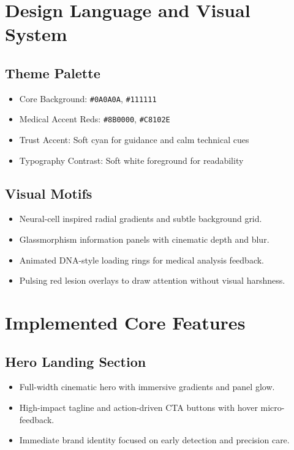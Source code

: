 \documentclass[12pt,a4paper]{article}
\begin{document}
\section{Design Language and Visual System}
\subsection{Theme Palette}
\begin{itemize}[leftmargin=1.5em]
    \item Core Background: \texttt{\#0A0A0A}, \texttt{\#111111}
    \item Medical Accent Reds: \texttt{\#8B0000}, \texttt{\#C8102E}
    \item Trust Accent: Soft cyan for guidance and calm technical cues
    \item Typography Contrast: Soft white foreground for readability
\end{itemize}

\subsection{Visual Motifs}
\begin{itemize}[leftmargin=1.5em]
    \item Neural-cell inspired radial gradients and subtle background grid.
    \item Glassmorphism information panels with cinematic depth and blur.
    \item Animated DNA-style loading rings for medical analysis feedback.
    \item Pulsing red lesion overlays to draw attention without visual harshness.
\end{itemize}

\section{Implemented Core Features}
\subsection{Hero Landing Section}
\begin{itemize}[leftmargin=1.5em]
    \item Full-width cinematic hero with immersive gradients and panel glow.
    \item High-impact tagline and action-driven CTA buttons with hover micro-feedback.
    \item Immediate brand identity focused on early detection and precision care.
\end{itemize}
\end{document}

